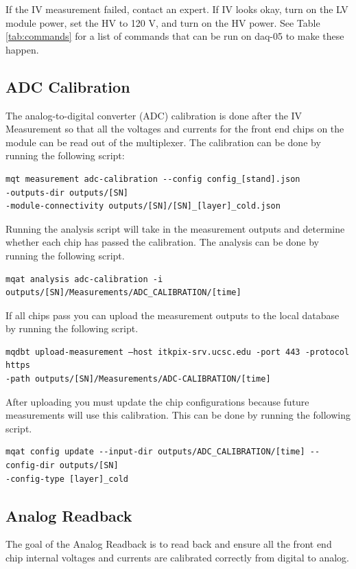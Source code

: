 \documentclass[12pt]{article}
\begin{document}
If the IV measurement failed, contact an expert. If IV looks okay, turn on the LV module power, set the HV to 120 V, and turn on the HV power. See Table \ref{tab:commands} for a list of commands that can be run on daq-05 to make these happen.  

\subsection{ADC Calibration}

The analog-to-digital converter (ADC) calibration is done after the IV Measurement so that all the voltages and currents for the front end chips on the module can be read out of the multiplexer. The calibration can be done by running the following script:
\begin{verbatim}
mqt measurement adc-calibration --config config_[stand].json 
-outputs-dir outputs/[SN]
-module-connectivity outputs/[SN]/[SN]_[layer]_cold.json
\end{verbatim}


Running the analysis script will take in the measurement outputs and determine whether each chip has passed the calibration. The analysis can be done by running the following script. 

\begin{verbatim}
mqat analysis adc-calibration -i outputs/[SN]/Measurements/ADC_CALIBRATION/[time]
\end{verbatim}
If all chips pass you can upload the measurement outputs to the local database by running the following script. 
\begin{verbatim}
mqdbt upload-measurement –host itkpix-srv.ucsc.edu -port 443 -protocol https
-path outputs/[SN]/Measurements/ADC-CALIBRATION/[time]
\end{verbatim}
After uploading you must update the chip configurations because future measurements will use this calibration. This can be done by running the following script. 
\begin{verbatim}
mqat config update --input-dir outputs/ADC_CALIBRATION/[time] --config-dir outputs/[SN] 
-config-type [layer]_cold
\end{verbatim}

\subsection{Analog Readback}

The goal of the Analog Readback is to read back and ensure all the front end chip internal voltages and currents are calibrated correctly from digital to analog.  
\end{document}
